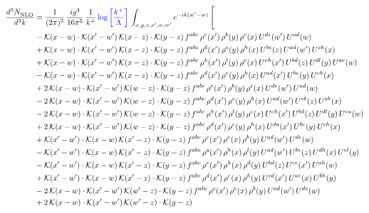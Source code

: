 \documentclass[9pt]{article}
\newcommand{\chg}[1]{{\color{red}#1}}
\numberwithin{equation}{section}
\begin{document}
\begin{align}
     \frac{d^{3}N_{\rm NLO}^{\rm}}{d^{3}k}  & = \frac{1}{(2\pi)^{3}}\, \frac{ig^{4}}{16\pi^{5}}\, \frac{1}{k^{+}}\,{\color{blue}\log{\left[\frac{k^{+}}{\Lambda}\right]}}\, \int_{x,y,z,x^{\prime},w,w^{\prime}}e^{-ik(w^{\prime}-w)}\, \Bigg[\notag \\ & -\mathcal{K}(x-w)\cdot \mathcal{K}(x'-w')\, \mathcal{K}(x-z)\cdot \mathcal{K}(y-z)\, f^{abc}\, \rho^{e}(x')\,\rho^{b}(y)\,\rho^{c}(x)\,U^{de}(w')\,U^{ad}(w)\notag \\ & + \mathcal{K}(x-w)\cdot \mathcal{K}(x'-w')\, \mathcal{K}(x-z)\cdot \mathcal{K}(y-z)\, f^{abc}\, \rho^{d}(x')\,\rho^{e}(y)\,\rho^{h}(x)\,U^{be}(z)\,U^{ad}(w')\,U^{ch}(x)\notag \\ & + \mathcal{K}(x-w)\cdot \mathcal{K}(x'-w')\, \mathcal{K}(x-z)\cdot \mathcal{K}(y-z)\, f^{abc}\, \rho^{h}(x')\,\rho^{l}(y)\,\rho^{c}(x)\,U^{eh}(x')\,U^{bd}(z)\,U^{dl}(y)\,U^{ae}(w)\notag \\ & -\mathcal{K}(x-w)\cdot \mathcal{K}(x'-w')\, \mathcal{K}(x-z)\cdot \mathcal{K}(y-z)\, f^{abc}\, \rho^{d}(x')\,\rho^{e}(y)\,\rho^{h}(x)\,U^{ad}(x')\,U^{be}(y)\,U^{ch}(x)\notag \\ & + 2\,\mathcal{K}(x-w)\cdot \mathcal{K}(x'-w')\chg{\,} \mathcal{K}(w-z)\cdot \mathcal{K}(y-z)\, f^{abc}\, \rho^{e}(x')\,\rho^{b}(y)\,\rho^{c}(x)\,U^{de}(w')\,U^{ad}(w)\notag \\ & - 2\,\mathcal{K}(x-w)\cdot \mathcal{K}(x'-w')\chg{\,} \mathcal{K}(w-z)\cdot \mathcal{K}(y-z)\, f^{abc}\, \rho^{d}(x')\,\rho^{e}(y)\,\rho^{h}(x)\,U^{ad}(w')\,U^{eb}(z)\,U^{ch}(x)\notag \\ & - 2\,\mathcal{K}(x-w)\cdot \mathcal{K}(x'-w')\chg{\,} \mathcal{K}(w-z)\cdot \mathcal{K}(y-z)\, f^{abc}\, \rho^{h}(x')\,\rho^{l}(y)\,\rho^{c}(x)\,U^{eh}(x')\,U^{bd}(z)\,U^{dl}(y)\,U^{ea}(w)\notag \\ &  + 2\,\mathcal{K}(x-w)\cdot \mathcal{K}(x'-w')\chg{\,} \mathcal{K}(w-z)\cdot \mathcal{K}(y-z)\, f^{abc}\, \rho^{d}(x')\,\rho^{e}(y)\,\rho^{h}(x)\,U^{da}(x')\,U^{be}(y)\,U^{ch}(x)\notag \\ & + \mathcal{K}(x'-w')\cdot \mathcal{K}(x-w)\, \mathcal{K}(x'-z)\cdot \mathcal{K}(y-z)\, f^{abc}\,\rho^{c}(x')\,\rho^{e}(x)\,\rho^{b}(y)\, U^{ad}(w')\,U^{de}(w)\notag \\ & -\mathcal{K}(x'-w')\cdot \mathcal{K}(x-w)\, \mathcal{K}(x'-z)\cdot \mathcal{K}(y-z)\, f^{abc}\,\rho^{c}(x')\,\rho^{h}(x)\,\rho^{l}(y)\, U^{ad}(w')\,U^{be}(z)\,U^{dh}(x)\,U^{el}(y)\notag \\ & -\mathcal{K}(x'-w')\cdot \mathcal{K}(x-w)\, \mathcal{K}(x'-z)\cdot \mathcal{K}(y-z)\, f^{abc}\,\rho^{e}(x')\,\rho^{h}(x)\,\rho^{d}(y)\, U^{bd}(z)\,U^{ce}(x')\,U^{ah}(w)\notag \\ & +\mathcal{K}(x'-w')\cdot \mathcal{K}(x-w)\, \mathcal{K}(x'-z)\cdot \mathcal{K}(y-z)\, f^{abc}\,\rho^{d}(x')\,\rho^{e}(x)\,\rho^{h}(y)\, U^{cd}(x')\,U^{ae}(x)\,U^{bh}(y)\notag \\ & -2\, \mathcal{K}(x-w)\cdot \mathcal{K}(x'-w')\, \mathcal{K}(w'-z)\cdot \mathcal{K}(y-z)\, f^{abc}\,\rho^{c}(x')\,\rho^{e}(x)\,\rho^{b}(y)\,U^{ad}(w')\,U^{de}(w)\notag \\ & +2\, \mathcal{K}(x-w)\cdot \mathcal{K}(x'-w')\, \mathcal{K}(w'-z)\cdot \mathcal{K}(y-z)\, 
\end{align}
\end{document}
